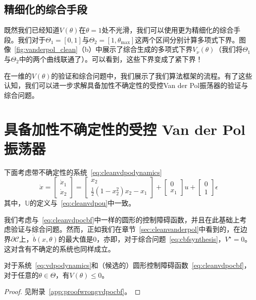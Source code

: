 \subsection{精细化的综合手段}
既然我们已经知道$V(\theta)$在$\theta = 1$处不光滑，我们可以使用更为精细化的综合手段。我们对于$\Theta_1 = [0, 1]$与$\Theta_2 = [1, \theta_{\max}]$这两个区间分别计算多项式下界。图像~\ref{fig:vanderpol_clean}（b）中展示了综合生成的多项式下界$V_\nu(\theta)$（我们将$\Theta_1$与$\Theta_2$中的两个曲线联通了）。可以看到，这些下界变成了紧下界！

在一维的$V(\theta)$的验证和综合问题中，我们展示了我们算法框架的流程。有了这些认知，我们可以进一步求解具备加性不确定性的受控Van der Pol振荡器的验证与综合问题。

\section{具备加性不确定性的受控 Van der Pol 振荡器}
\label{sec:uncertainvanderpol}

下面考虑带不确定性的系统~\eqref{eq:cleanvdpodynamics}
\begin{equation}\label{eq:vdpodynamics}
    \dot{x} = \left[ \begin{array}{c}
        \dot{x}_1 \\ \dot{x}_2
    \end{array} \right] 
    = \left[ \begin{array}{c}
        x_2 \\
        \frac{1}{2}(1 - x_2^2) x_2 - x_1
    \end{array} \right]
    + \left[ \begin{array}{c}
        0 \\ x_1
    \end{array} \right] u
    + \left[ \begin{array}{c}
        0 \\ 1
    \end{array} \right] \epsilon
\end{equation}
其中，$\mathbb{U}$的定义与~\eqref{eq:cleanvdpou}中一致。

我们考虑与~\eqref{eq:cleanvdpocbf}中一样的圆形的控制障碍函数，并且在此基础上考虑验证与综合问题。然而，正如我们在章节~\ref{sec:cleanvanderpol}中看到的，在边界$\partial \mathcal{C}$上，$\dot{b}(x, \theta)$的最大值是$0$，亦即，对于综合问题~\eqref{eq:cbfsynthesis}，$V^\star = 0$。这对含有不确定的系统也同样成立。

\begin{proposition}\label{prop:wrongvdpocbf}
    对于系统~\eqref{eq:vdpodynamics}和（候选的）圆形控制障碍函数~\eqref{eq:cleanvdpocbf}，对于任意的$\theta \in \Theta$，有$V(\theta) \le 0$。
\end{proposition}
\begin{proof}
    见附录~\ref{app:proofwrongvdpocbf}。
\end{proof}

